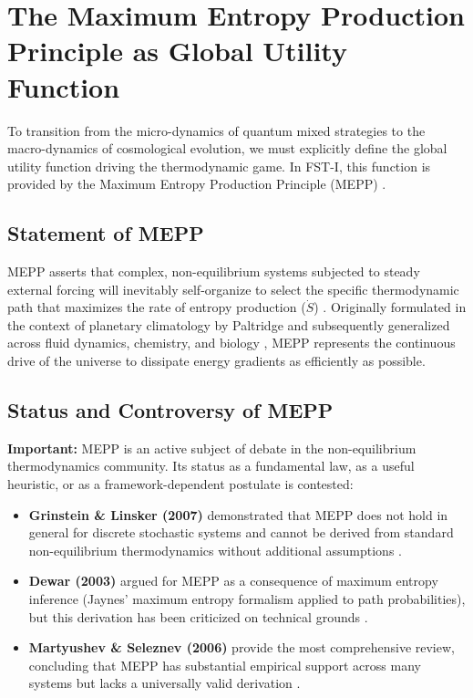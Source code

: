 \documentclass[12pt,a4paper]{article}
\theoremstyle{remark}
\begin{document}
\section{The Maximum Entropy Production Principle as Global Utility Function}
\label{sec:mepp}

To transition from the micro-dynamics of quantum mixed strategies to the macro-dynamics of cosmological evolution, we must explicitly define the global utility function driving the thermodynamic game. In FST-I, this function is provided by the Maximum Entropy Production Principle (MEPP) \citep{MEPP2010}.

\subsection{Statement of MEPP}

MEPP asserts that complex, non-equilibrium systems subjected to steady external forcing will inevitably self-organize to select the specific thermodynamic path that maximizes the rate of entropy production ($\dot{S}$) \citep{MEPPFoundations}. Originally formulated in the context of planetary climatology by Paltridge and subsequently generalized across fluid dynamics, chemistry, and biology \citep{MEPP2010}, MEPP represents the continuous drive of the universe to dissipate energy gradients as efficiently as possible.

\subsection{Status and Controversy of MEPP}

\textbf{Important:} MEPP is an active subject of debate in the non-equilibrium thermodynamics community. Its status as a fundamental law, as a useful heuristic, or as a framework-dependent postulate is contested:

\begin{itemize}
    \item \textbf{Grinstein \& Linsker (2007)} demonstrated that MEPP does not hold in general for discrete stochastic systems and cannot be derived from standard non-equilibrium thermodynamics without additional assumptions \citep{GrinsteinLinsker2007}.
    \item \textbf{Dewar (2003)} argued for MEPP as a consequence of maximum entropy inference (Jaynes' maximum entropy formalism applied to path probabilities), but this derivation has been criticized on technical grounds \citep{Dewar2003}.
    \item \textbf{Martyushev \& Seleznev (2006)} provide the most comprehensive review, concluding that MEPP has substantial empirical support across many systems but lacks a universally valid derivation \citep{MEPP2023}.
\end{itemize}
\end{document}
